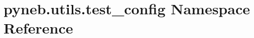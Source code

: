 \hypertarget{namespacepyneb_1_1utils_1_1test__config}{\section{pyneb.\-utils.\-test\-\_\-config Namespace Reference}
\label{namespacepyneb_1_1utils_1_1test__config}
}

